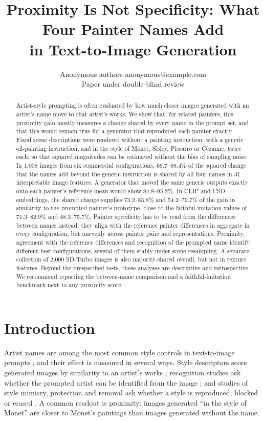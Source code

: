 \documentclass[10pt]{article}
\title{Proximity Is Not Specificity: What Four Painter Names Add\\in Text-to-Image Generation}
\author{\name Anonymous authors \email anonymous@example.com \\
      \addr Paper under double-blind review}
\begin{document}
\maketitle

\begin{abstract}
Artist-style prompting is often evaluated by how much closer images generated with an
artist's name move to that artist's works. We show that, for related painters, this
proximity gain mostly measures a change shared by every name in the prompt set, and that
this would remain true for a generator that reproduced each painter exactly. Fixed scene
descriptions were rendered without a painting instruction, with a generic oil-painting
instruction, and in the style of Monet, Sisley, Pissarro or C\'ezanne, twice each, so that
squared magnitudes can be estimated without the bias of sampling noise. In 1,008 images from
six commercial configurations, 66.7--88.4\% of the squared change that the names add beyond
the generic instruction is shared by all four names in 31 interpretable image features. A
generator that moved the same generic outputs exactly onto each painter's reference mean
would show 84.8--95.2\%. In CLIP and CSD embeddings, the shared change supplies
73.2--83.8\% and 54.2--79.7\% of the gain in similarity to the prompted painter's
prototype, close to the faithful-imitation values of 71.3--82.9\% and 48.3--75.7\%. Painter
specificity has to be read from the differences between names instead: they align with the
reference painter differences in aggregate in every configuration, but unevenly across
painter pairs and representations. Proximity, agreement with the reference differences and
recognition of the prompted name identify different best configurations, several of them
stably under scene resampling. A separate collection of 2,000 SD-Turbo images is also
majority-shared overall, but not in texture features. Beyond the prespecified
tests, these analyses are descriptive and retrospective. We recommend reporting the
between-name comparison and a faithful-imitation benchmark next to any proximity score.
\end{abstract}

\section{Introduction}\label{sec:intro}

Artist names are among the most common style controls in text-to-image prompts
\citep{wang2023diffusiondb}, and their effect is measured in several ways. Style descriptors
score generated images by similarity to an artist's works \citep{somepalli2024style};
recognition studies ask whether the prompted artist can be identified from the image
\citep{casper2023measuring,su2025prompted,moayeri2025rethinking}; and studies of style
mimicry, protection and removal ask whether a style is reproduced, blocked or erased
\citep{shan2023glaze,honig2025adversarial,gandikota2023erasing,kumari2023ablating,zhang2024unlearncanvas}.
A common readout is proximity: images generated ``in the style of Monet'' are closer to
Monet's paintings than images generated without the name.
\end{document}
